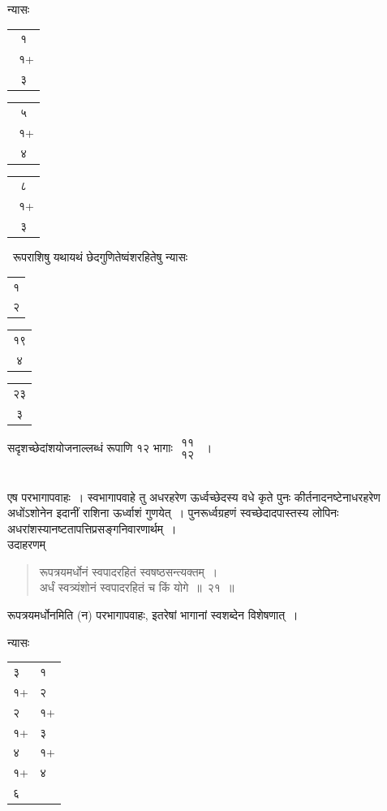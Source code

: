 \documentclass[10pt, openany]{book}
\begin{document}
{न्यासः\textendash \,\begin{tabular}{c|}१\\~१+\\३\end{tabular} \begin{tabular}{c|} ५\\~१+\\४\end{tabular} \begin{tabular}{c|}८\\~१+\\३\end{tabular} ~रूपराशिषु \;यथायथं \;छेदगुणितेष्वंशरहितेषु \;न्यासः\textemdash \,\begin{tabular}{c|}१\\२\end{tabular}\begin{tabular}{c|}१९\\४\end{tabular}\begin{tabular}{c|}२३\\३\end{tabular} सदृशच्छेदांशयोजनाल्लब्धं रूपाणि १२ भागाः $\begin{matrix}

\mbox{{११}}\\

\mbox{{१२}}

\end{matrix}$~।}\\

{एष परभागापवाहः~। स्वभागापवाहे तु अधरहरेण ऊर्ध्वच्छेदस्य वधे कृते पुनः}
{कीर्तनादनष्टेनाधरहरेण अधोंऽशोनेन इदानीं राशिना ऊर्ध्वाशं गुणयेत्~।
पुनरूर्ध्वग्रहणं}
{स्वच्छेदादपास्तस्य लोपिनः अधरांशस्यानष्टतापत्तिप्रसङ्गनिवारणार्थम्~।}\\

{उदाहरणम्\textemdash}

\begin{quote}
{\eg रूपत्रयमर्धोनं स्वपादरहितं स्वषष्ठसन्त्यक्तम्~। \\
 अर्धं स्वत्र्यंशोनं स्वपादरहितं च किं योगे~॥~२१~॥}\end{quote}

{रूपत्रयमर्धोनमिति (न) परभागापवाहः, इतरेषां भागानां स्वशब्देन
विशेषणात्~।}

\newpage

{न्यासः\textemdash}

\hspace{15mm} \begin{tabular}{ll}३ &१ \\
 १+ &२ \\
 २ &१+ \\
 १+ &३ \\
 ४ &१+ \\
 १+ &४\\
 ६& 
 \end{tabular}
\end{document}
